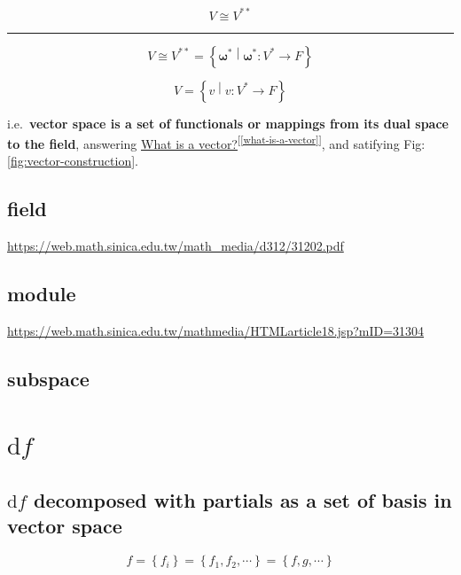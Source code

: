 \documentclass[
]{book}
\theoremstyle{definition}
\theoremstyle{definition}
\theoremstyle{definition}
\theoremstyle{definition}
\theoremstyle{remark}
\begin{document}
\[
V\cong V^{**}
\]

\begin{center}\rule{0.5\linewidth}{0.5pt}\end{center}

\[
V\cong V^{**}=\left\{ \boldsymbol{\omega}^{*}\middle|\boldsymbol{\omega}^{*}:V^{*}\rightarrow F\right\} 
\]

\[
V=\left\{ v\middle|v:V^{*}\rightarrow F\right\} 
\]

i.e.~\textbf{vector space is a set of functionals or mappings from its dual space to the field}, answering \hyperref[what-is-a-vector]{What is a vector?}\textsuperscript{{[}\ref{what-is-a-vector}{]}}, and satifying Fig: \ref{fig:vector-construction}.

\section{field}\label{field}

\url{https://web.math.sinica.edu.tw/math_media/d312/31202.pdf}

\section{module}\label{module}

\url{https://web.math.sinica.edu.tw/mathmedia/HTMLarticle18.jsp?mID=31304}

\section{subspace}\label{subspace}

\chapter{\texorpdfstring{\(\mathrm{d}f\)}{\textbackslash mathrm\{d\}f}}\label{mathrmdf}

\section{\texorpdfstring{\(\mathrm{d}f\) decomposed with partials as a set of basis in vector space}{\textbackslash mathrm\{d\}f decomposed with partials as a set of basis in vector space}}\label{mathrmdf-decomposed-with-partials-as-a-set-of-basis-in-vector-space}

\[
f=\left\{ f_{{\scriptscriptstyle i}}\right\} =\left\{ f_{{\scriptscriptstyle 1}},f_{{\scriptscriptstyle 2}},\cdots\right\} =\left\{ f,g,\cdots\right\} 
\]
\end{document}
